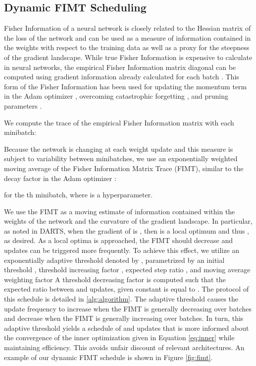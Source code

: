 \documentclass[letterpaper]{article} \usepackage{aaai22}  \usepackage{times}  \usepackage{helvet}  \usepackage{courier}  \usepackage[hyphens]{url}  \usepackage{graphicx} \urlstyle{rm} \def\UrlFont{\rm}  \usepackage{natbib}  \usepackage{caption} \DeclareCaptionStyle{ruled}{labelfont=normalfont,labelsep=colon,strut=off} \frenchspacing  \setlength{\pdfpagewidth}{8.5in}  \setlength{\pdfpageheight}{11in}  \usepackage{algorithm}
\begin{document}
\subsection{Dynamic FIMT Scheduling}
Fisher Information of a neural network is closely related to the Hessian matrix of the loss of the network and can be used as a measure of information contained in the weights with respect to the training data as well as a proxy for the steepness of the gradient landscape. While true Fisher Information is expensive to calculate in neural networks, the empirical Fisher Information matrix diagonal can be computed using gradient information already calculated for each batch \cite{martens2016second}. This form of the Fisher Information has been used for updating the momentum term in the Adam optimizer \cite{kingma2014adam}, overcoming catastrophic forgetting \cite{kirkpatrick2017overcoming}, and pruning parameters \cite{tu2016reducing,theis2018faster}.

We compute the trace of the empirical Fisher Information matrix with each minibatch:

Because the network is changing at each weight update and this measure is subject to variability between minibatches, we use an exponentially weighted moving average of the Fisher Information Matrix Trace (FIMT), similar to the decay factor in the Adam optimizer \cite{kingma2014adam}:

for the th minibatch, where  is a hyperparameter.

We use the FIMT as a moving estimate of information contained within the weights of the network and the curvature of the gradient landscape. In particular, as noted in DARTS, when the gradient of  is , then  is a local optimum and thus , as desired. As a local optima is approached, the FIMT should decrease and  updates can be triggered more frequently. To achieve this effect, we utilize an exponentially adaptive threshold denoted by , parametrized by an initial threshold , threshold increasing factor , expected step ratio , and moving average weighting factor  A threshold decreasing factor  is computed such that the expected ratio between  and  updates, given constant  is equal to . The protocol of this schedule is detailed in \ref{alg:algorithm}. The adaptive threshold causes the  update frequency to increase when the FIMT is generally decreasing over batches and decrease when the FIMT is generally increasing over batches. In turn, this adaptive threshold yields a schedule of  and  updates that is more informed about the convergence of the inner optimization given in Equation \ref{eq:inner} while maintaining efficiency. This avoids unfair discount of relevant architectures. An example of our dynamic FIMT schedule is shown in Figure \ref{fig:fimt}. 
\end{document}

